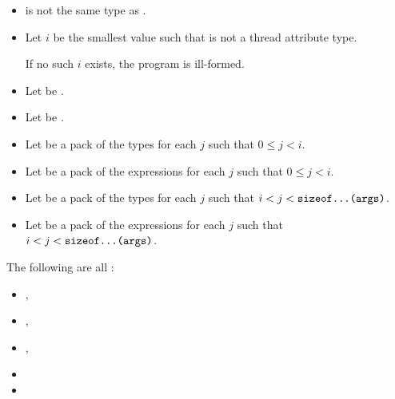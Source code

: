 \documentclass{wg21}
\begin{document}
\begin{itemdescr}

\pnum
\constraints
\begin{itemize}
\item {} is not the same type as .
\end{itemize}

\begin{addedblock}
\begin{itemize}[leftmargin=*]
\item Let $i$ be the smallest value such that  is not a thread attribute type.

If no such $i$ exists, the program is ill-formed.

\item Let  be .
\item Let  be .
\item Let  be a pack of the types  for each $j$ such that $ 0 \leq j < i $.
\item Let  be a pack of the expressions  for each $j$ such that $ 0 \leq j < i $.
\item Let  be a pack of the types  for each $j$ such that $ i < j < \texttt{sizeof...(args)}$.
\item Let  be a pack of the expressions  for each $j$ such that $ i <  j < \texttt{sizeof...(args)}$.
\end{itemize}
\end{addedblock}


%

\pnum
\mandates
The following are all :
\begin{itemize}
    \item {},
    \item {},
\begin{addedblock}
\end{addedblock}
    \item {},
    \item {}
    \item {}
\end{itemize}


\end{itemdescr}
\end{document}
